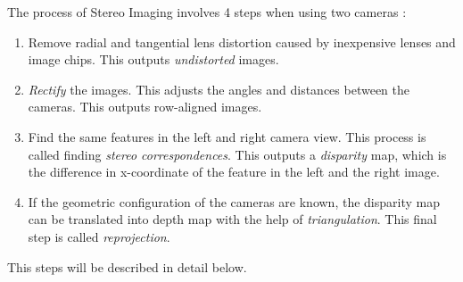 The process of Stereo Imaging involves 4 steps when using two cameras \cite{openCV}:
\begin{enumerate}
    \item Remove radial and tangential lens distortion caused by inexpensive lenses and
        image chips. This outputs \emph{undistorted} images. 
    \item \emph{Rectify} the images. This adjusts the angles and distances between the cameras.
        This outputs row-aligned images.
    \item Find the same features in the left and right camera view. This process is called
        finding \emph{stereo correspondences}. This outputs a \emph{disparity} map, which
        is the difference in x-coordinate of the feature in the left and the right image. 
    \item If the geometric configuration of the cameras are known, the disparity map can
        be translated into depth map with the help of \emph{triangulation}. This final
        step is called \emph{reprojection}.
\end{enumerate}
This steps will be described in detail below. 


